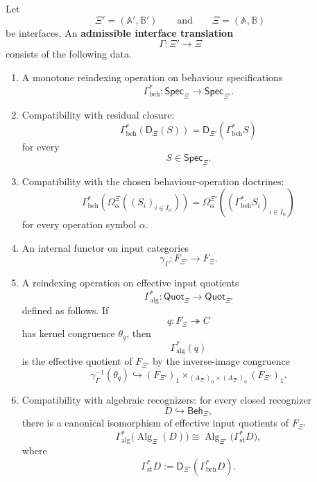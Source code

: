 \begin{definition}
\label{def:eilenberg-admissible-interface-translation}
Let
\[
\Xi'=(\mathbb A',\mathbb B')
\qquad\text{and}\qquad
\Xi=(\mathbb A,\mathbb B)
\]
be interfaces. An \textbf{admissible interface translation}
\[
\Gamma:\Xi'\to\Xi
\]
consists of the following data.

\begin{enumerate}
\item A monotone reindexing operation on behaviour specifications
\[
\Gamma_{\mathrm{beh}}^\ast:
\mathsf{Spec}_{\Xi}
\to
\mathsf{Spec}_{\Xi'}.
\]

\item Compatibility with residual closure:
\[
\Gamma_{\mathrm{beh}}^\ast(\mathsf D_\Xi(S))
=
\mathsf D_{\Xi'}(\Gamma_{\mathrm{beh}}^\ast S)
\]
for every
\[
S\in\mathsf{Spec}_{\Xi}.
\]

\item Compatibility with the chosen behaviour-operation doctrines:
\[
\Gamma_{\mathrm{beh}}^\ast
\left(
\Omega_\alpha^\Xi((S_i)_{i\in I_\alpha})
\right)
=
\Omega_\alpha^{\Xi'}
\left(
(\Gamma_{\mathrm{beh}}^\ast S_i)_{i\in I_\alpha}
\right)
\]
for every operation symbol \(\alpha\).

\item An internal functor on input categories
\[
\gamma_\Gamma:F_{\Xi'}\to F_\Xi.
\]

\item A reindexing operation on effective input quotients
\[
\Gamma_{\mathrm{alg}}^\ast:
\mathsf{Quot}_{\Xi}
\to
\mathsf{Quot}_{\Xi'}
\]
defined as follows. If
\[
q:F_\Xi\twoheadrightarrow C
\]
has kernel congruence \(\theta_q\), then
\[
\Gamma_{\mathrm{alg}}^\ast(q)
\]
is the effective quotient of \(F_{\Xi'}\) by the inverse-image congruence
\[
\gamma_\Gamma^{-1}(\theta_q)
\hookrightarrow
(F_{\Xi'})_1\times_{(A_{\Xi'})_0\times(A_{\Xi'})_0}(F_{\Xi'})_1.
\]

\item Compatibility with algebraic recognizers: for every closed recognizer
\[
D\hookrightarrow\mathsf{Beh}_{\Xi},
\]
there is a canonical isomorphism of effective input quotients of \(F_{\Xi'}\)
\[
\Gamma_{\mathrm{alg}}^\ast
\bigl(
\operatorname{Alg}_{\Xi}(D)
\bigr)
\cong
\operatorname{Alg}_{\Xi'}
\bigl(
\Gamma_{\mathrm{st}}^\ast D
\bigr),
\]
where
\[
\Gamma_{\mathrm{st}}^\ast D
:=
\mathsf D_{\Xi'}(\Gamma_{\mathrm{beh}}^\ast D).
\]
\end{enumerate}
\end{definition}

